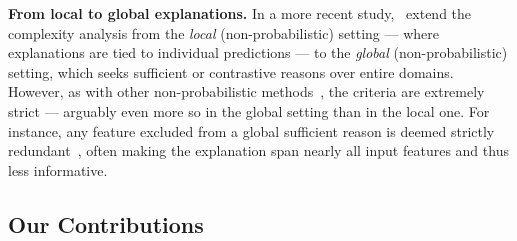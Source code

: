 \documentclass{article}
\begin{document}
\textbf{From local to global explanations.} In a more recent study,~\cite{bassanlocal} extend the complexity analysis from the \emph{local} (non-probabilistic) setting --- where explanations are tied to individual predictions --- to the \emph{global} (non-probabilistic) setting, which seeks sufficient or contrastive reasons over entire domains. However, as with other non-probabilistic methods~\citep{ignatiev2019abduction, BaMoPeSu20, ArBaBaPeSu21, darwiche2020reasons}, the criteria are extremely strict --- arguably even more so in the global setting than in the local one. For instance, any feature excluded from a global sufficient reason is deemed strictly redundant~\citep{bassanlocal}, often making the explanation span nearly all input features and thus less informative.





\subsection*{Our Contributions}
\end{document}
